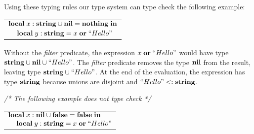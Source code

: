 Using these typing rules our type system can type check the following
example:
\begin{center}
\begin{tabular}{ll}
\multicolumn{2}{l}{$\mathbf{local} \; x:\mathbf{string} \cup \mathbf{nil} = \mathbf{nothing} \; \mathbf{in}$}\\
& \multicolumn{1}{l}{$\mathbf{local} \; y:\mathbf{string} = x \; \mathbf{or} \; ``Hello"$}
\end{tabular}
\end{center}

Without the \emph{filter} predicate,
the expression $x \; \mathbf{or} \; ``Hello"$ would have type
$\mathbf{string} \cup \mathbf{nil} \cup ``Hello"$.
The \emph{filter} predicate removes the type $\mathbf{nil}$ from the result,
leaving type $\mathbf{string} \cup ``Hello"$.
At the end of the evaluation, the expression has type $\mathbf{string}$
because unions are disjoint and $``Hello" <: \mathbf{string}$.

\textit{/* The following example does not type check */}
\begin{center}
\begin{tabular}{ll}
\multicolumn{2}{l}{$\mathbf{local} \; x:\mathbf{nil} \cup \mathbf{false} = \mathbf{false} \; \mathbf{in}$}\\
& \multicolumn{1}{l}{$\mathbf{local} \; y:\mathbf{string} = x \; \mathbf{or} \; ``Hello"$}
\end{tabular}
\end{center}

